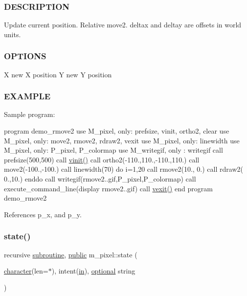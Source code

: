 \subsubsection*{D\+E\+S\+C\+R\+I\+P\+T\+I\+ON}

Update current position. Relative move2. deltax and deltay are offsets in world units. \subsubsection*{O\+P\+T\+I\+O\+NS}

X new X position Y new Y position \subsubsection*{E\+X\+A\+M\+P\+LE}

Sample program\+:

program demo\+\_\+rmove2 use M\+\_\+pixel, only\+: prefsize, vinit, ortho2, clear use M\+\_\+pixel, only\+: move2, rmove2, rdraw2, vexit use M\+\_\+pixel, only\+: linewidth use M\+\_\+pixel, only\+: P\+\_\+pixel, P\+\_\+colormap use M\+\_\+writegif, only \+: writegif call prefsize(500,500) call \hyperlink{namespacem__pixel_ac03ca8f23fdadb60599b6ea4dc87a6d9}{vinit()} call ortho2(-\/110.,110.,-\/110.,110.) call move2(-\/100.,-\/100.) call linewidth(70) do i=1,20 call rmove2(10., 0.) call rdraw2( 0.,10.) enddo call writegif(\textquotesingle{}rmove2..\+gif\textquotesingle{},P\+\_\+pixel,P\+\_\+colormap) call execute\+\_\+command\+\_\+line(\textquotesingle{}display rmove2..\+gif\textquotesingle{}) call \hyperlink{namespacem__pixel_a19ad6b65752322b0029a62cc0ebec3e8}{vexit()} end program demo\+\_\+rmove2 

References p\+\_\+x, and p\+\_\+y.

\mbox{\label{namespacem__pixel_aa24c465b23b0ddda341e97bc206fe249}} 
\subsubsection{\texorpdfstring{state()}{state()}}
{\footnotesize\ttfamily recursive \hyperlink{M__stopwatch_83_8txt_acfbcff50169d691ff02d4a123ed70482}{subroutine}, \hyperlink{M__stopwatch_83_8txt_a2f74811300c361e53b430611a7d1769f}{public} m\+\_\+pixel\+::state (\begin{DoxyParamCaption}\item[{\hyperlink{option__stopwatch_83_8txt_abd4b21fbbd175834027b5224bfe97e66}{character}(len=$\ast$), intent(\hyperlink{M__journal_83_8txt_afce72651d1eed785a2132bee863b2f38}{in}), \hyperlink{option__stopwatch_83_8txt_aa4ece75e7acf58a4843f70fe18c3ade5}{optional}}]{string }\end{DoxyParamCaption})}



